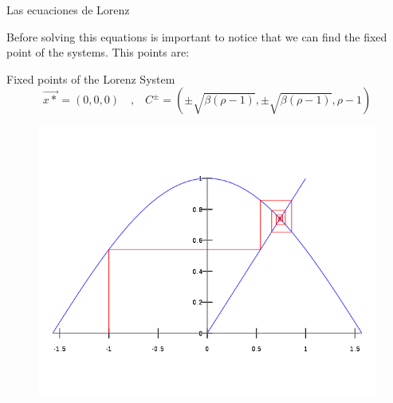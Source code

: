 \documentclass[hyperref={pdfpagelabels=false}]{beamer}
\begin{document}
\begin{frame}{Las ecuaciones de Lorenz}

Before solving this equations is important to notice that we can find the fixed point of the systems. This points are:

\begin{block}{Fixed points of the Lorenz System}
\begin{equation*}
 \Vec{x*}=(0,0,0) \quad \text{,} \quad C^{\pm}=(\pm\sqrt{\beta(\rho-1)},\pm \sqrt{\beta(\rho-1)},\rho-1) 
 \end{equation*}
\end{block}
\vspace{-15pt}
\begin{figure}
        \includegraphics[width=0.55\linewidth]{Figures/fixed.png}\\ 
    \end{figure}


\end{frame}
\end{document}
